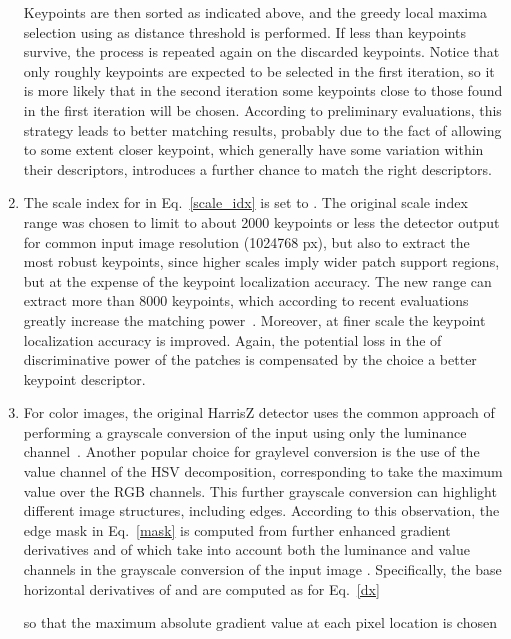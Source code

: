 \documentclass[times,twocolumn,final,authoryear]{elsarticle}
\begin{document}
\begin{enumerate}
	Keypoints are then sorted as indicated above, and the greedy local maxima selection using  as distance threshold is performed. If less than  keypoints survive, the process is repeated again on the discarded keypoints. Notice that only roughly  keypoints are expected to be selected in the first iteration, so it is more likely that in the second iteration some keypoints close to those found in the first iteration will be chosen. According to preliminary evaluations, this strategy leads to better matching results, probably due to the fact of allowing to some extent closer keypoint, which  generally have some variation within their descriptors, introduces a further chance to match the right descriptors.
	\item\label{s3} The scale index  for  in Eq.~\ref{scale_idx} is set to . The original scale index range  was chosen to limit to about 2000 keypoints or less the detector output for common input image resolution (1024768 px), but also to extract the most robust keypoints, since higher scales imply wider patch support regions, but at the expense of the keypoint localization accuracy. The new range can extract more than 8000 keypoints, which according to recent evaluations greatly increase the matching power~\citep{imw2020}. Moreover, at finer scale the keypoint localization accuracy is improved. Again, the potential loss in the of discriminative power of the patches is compensated by the choice a better keypoint descriptor.
	\item\label{s4} For color images, the original HarrisZ detector uses the common approach of performing a grayscale conversion of the input using only
	the luminance channel~\citep{gonzalez}. Another popular choice for graylevel conversion is the use of the value channel of the HSV decomposition, corresponding to take the maximum value over the RGB channels. This further grayscale conversion can highlight different image structures, including edges. According to this observation, the edge mask  in Eq.~\ref{mask} is computed from further enhanced gradient derivatives  and  of  which take into account both the luminance  and value  channels in the grayscale conversion of the input image . Specifically, the base horizontal derivatives of  and  are computed as for Eq.~\ref{dx}
	
so that the maximum absolute gradient value at each pixel location  is chosen
	

\end{enumerate}
\end{document}
